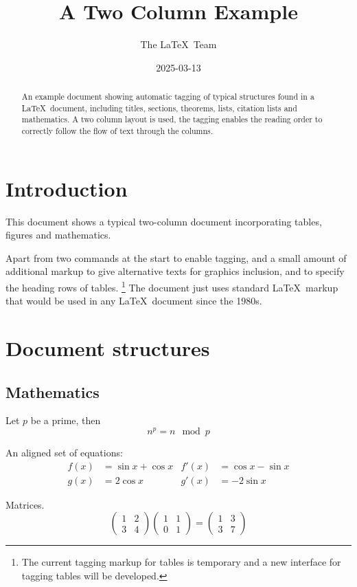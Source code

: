 \documentclass[a4paper,twocolumn]{article}
\begin{document}
\title{A Two Column Example}
\date{2025-03-13}
\author{The \LaTeX\ Team}

\pagestyle{headings}

\maketitle

\begin{abstract}
  An example document showing automatic tagging of typical structures
  found in a \LaTeX\ document, including titles, sections, theorems, lists,
  citation lists and mathematics. A two column layout is used, the
  tagging enables the reading order to correctly follow the flow of
  text through the columns.
\end{abstract}

\tableofcontents

\section{Introduction}

This document shows a typical two-column document incorporating tables, figures and mathematics.

Apart from two commands at the start to enable tagging, and a small
amount of additional markup to give alternative texts for graphics
inclusion, and to specify the heading rows of tables.%
\footnote{The current tagging markup for tables is temporary and a new interface
for tagging tables will be developed.} The document
just uses standard \LaTeX\ markup that would be used in any \LaTeX\
document since the 1980s.

\section{Document structures}

\subsection{Mathematics}

Let $p$ be a prime, then
\[n^p=n \mod p\]

An aligned set of equations:
\begin{align}
  f(x)&=\sin x + \cos x  & f'(x) &=\cos x - \sin x \\
  g(x)&=2\cos x          & g'(x) &= -2\sin x 
\end{align}

Matrices.
\[
\begin{pmatrix}1&2\\3&4\end{pmatrix}
\begin{pmatrix}1&1\\0&1\end{pmatrix}
=
\begin{pmatrix}1&3\\3&7\end{pmatrix}
\]
\end{document}
